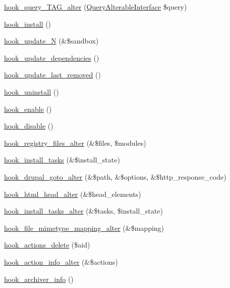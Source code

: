 \begin{DoxyCompactItemize}
\item 
\hyperlink{group__hooks_ga12527037deeb76adcab1000e984fdfce}{hook\_\-query\_\-TAG\_\-alter} (\hyperlink{interfaceQueryAlterableInterface}{QueryAlterableInterface} \$query)
\item 
\hyperlink{group__hooks_ga1ecdb5a2a046ea63dc790c3ed90338e5}{hook\_\-install} ()
\item 
\hyperlink{group__hooks_ga908950689e6b85cd0fae3b780d69a41f}{hook\_\-update\_\-N} (\&\$sandbox)
\item 
\hyperlink{group__hooks_ga23e9e019b7ec64d95bafbeaffd295483}{hook\_\-update\_\-dependencies} ()
\item 
\hyperlink{group__hooks_ga2fc0f6e61d252afa19e87804dbfdb558}{hook\_\-update\_\-last\_\-removed} ()
\item 
\hyperlink{group__hooks_ga3fb24f6923b3e585d6326ff5abdcc57c}{hook\_\-uninstall} ()
\item 
\hyperlink{group__hooks_gaedcfb58c08d5c5f8ffcd1059ceeb39e4}{hook\_\-enable} ()
\item 
\hyperlink{group__hooks_ga5872573d2180aa4b306e7d6c08a74c10}{hook\_\-disable} ()
\item 
\hyperlink{group__hooks_ga5b1201bb1afca26333900cd9aca6a2de}{hook\_\-registry\_\-files\_\-alter} (\&\$files, \$modules)
\item 
\hyperlink{group__hooks_gafcb418f1e1f7c8acb94ffa12d6bef79f}{hook\_\-install\_\-tasks} (\&\$install\_\-state)
\item 
\hyperlink{group__hooks_ga3c043f34f18e1c77daa341038a28e1ba}{hook\_\-drupal\_\-goto\_\-alter} (\&\$path, \&\$options, \&\$http\_\-response\_\-code)
\item 
\hyperlink{group__hooks_ga0769a87ac64497be6b87aea2b640839c}{hook\_\-html\_\-head\_\-alter} (\&\$head\_\-elements)
\item 
\hyperlink{group__hooks_ga71d761aa86808ce445157b271cb77a25}{hook\_\-install\_\-tasks\_\-alter} (\&\$tasks, \$install\_\-state)
\item 
\hyperlink{group__hooks_gaac5bb0122941c0b10df08d65ec358e99}{hook\_\-file\_\-mimetype\_\-mapping\_\-alter} (\&\$mapping)
\item 
\hyperlink{group__hooks_ga21102314b21e33695c3967922b4d9efe}{hook\_\-actions\_\-delete} (\$aid)
\item 
\hyperlink{group__hooks_ga141677d430a340c375bea9e1098a7a82}{hook\_\-action\_\-info\_\-alter} (\&\$actions)
\item 
\hyperlink{group__hooks_ga1c5bd8d11e7d54242528f85434e5b260}{hook\_\-archiver\_\-info} ()

\end{DoxyCompactItemize}
